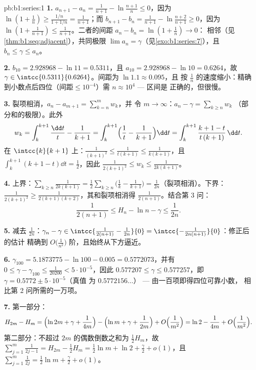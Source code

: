 \begin{solution}{pb:b1:series:1}
\textbf{1.} $a_{n+1} - a_n = \frac{1}{n+1} - \ln\frac{n+1}{n}
\leq 0$，因为 $\ln(1 + \frac1n) \geq \frac{1/n}{1 + 1/n} =
\frac{1}{n+1}$；而 $b_{n+1} - b_n = \frac{1}{n+1} -
\ln\frac{n+2}{n+1} \geq 0$，因为 $\ln(1 + \frac{1}{n+1}) \leq
\frac{1}{n+1}$。二者的间距 $a_n - b_n = \ln(1 + \frac1n) \to 0$：
相邻（见\cref{thm:b1:seq:adjacent}），共同极限 $\lim
a_n = \gamma$（见\cref{exo:b1:series:7}），且 $b_n \leq \gamma
\leq a_n$。

\textbf{2.} $b_{10} = 2.928968 - \ln 11 = 0.5311$，且 $a_{10} =
2.928968 - \ln 10 = 0.6264$，故 $\gamma \in
\intcc{0.5311}{0.6264}$。间距为 $\ln 1.1 \approx 0.095$，且
按 $\frac1n$ 的速度缩小：精确到小数点后四位（$\text{间距} \leq
10^{-4}$）需 $n \approx 10^4$ --- 区间是
正确的，但很慢。

\textbf{3.} 裂项相消，$a_n - a_{m+1} = \sum_{k=n}^{m} w_k$，并
令 $m \to \infty$：$a_n - \gamma = \sum_{k\geq n} w_k$
（部分和的极限）。此外
\[
w_k = \int_k^{k+1} \frac{\dd t}{t} - \frac{1}{k+1}
= \int_k^{k+1} \Bigl(\frac1t - \frac{1}{k+1}\Bigr)\dd t
= \int_k^{k+1} \frac{k + 1 - t}{t\,(k+1)}\,\dd t .
\]
在 $\intcc{k}{k+1}$ 上：$\frac{1}{(k+1)^2} \leq \frac{1}{t(k+1)}
\leq \frac{1}{k(k+1)}$，且 $\int_k^{k+1}(k + 1 - t)\dd t =
\frac12$，因此 $\frac{1}{2(k+1)^2} \leq w_k \leq
\frac{1}{2k(k+1)}$。

\textbf{4.} 上界：$\sum_{k \geq n} \frac{1}{2k(k+1)} =
\frac12\sum_{k\geq n}\bigl(\frac1k - \frac{1}{k+1}\bigr) =
\frac{1}{2n}$（裂项相消）。下界：$\frac{1}{2(k+1)^2} \geq
\frac{1}{2(k+1)(k+2)}$，其和裂项相消得
$\frac{1}{2(n+1)}$。结合第 3 问：
\[
\frac{1}{2(n+1)} \leq H_n - \ln n - \gamma \leq \frac{1}{2n} .
\]

\textbf{5.} 减去 $\frac{1}{2n}$：$\gamma_n - \gamma \in
\intcc{\frac{1}{2(n+1)} - \frac{1}{2n}}{0} =
\intcc{-\frac{1}{2n(n+1)}}{0}$：修正后的估计
精确到 $O\bigl(\frac{1}{n^2}\bigr)$ 阶，且始终从下方逼近。

\textbf{6.} $\gamma_{100} = 5.1873775 - \ln 100 - 0.005 =
0.5772073$，并有 $0 \leq \gamma - \gamma_{100} \leq
\frac{1}{20200} < 5\cdot10^{-5}$，因此 $0.577207 \leq \gamma
\leq 0.577257$，即 $\gamma = 0.5772 \pm 5\cdot10^{-5}$（真值
为 $0.5772156\dots$） --- 由一百项即得四位可靠小数，
相比第 2 问所需的一万项。

\textbf{7.} 第一部分：
\[
H_{2m} - H_m = \Bigl(\ln 2m + \gamma + \frac{1}{4m}\Bigr)
- \Bigl(\ln m + \gamma + \frac{1}{2m}\Bigr) +
O\Bigl(\frac{1}{m^2}\Bigr)
= \ln 2 - \frac{1}{4m} + O\Bigl(\frac{1}{m^2}\Bigr).
\]
第二部分：不超过 $2m$ 的偶数倒数之和为 $\frac12 H_m$，故
$\sum_{j=1}^{m}\frac{1}{2j-1} = H_{2m} - \frac12 H_m = \frac12
\ln m + \ln 2 + \frac\gamma2 + o(1)$，且 $\sum_{j=1}^m
\frac{1}{2j} = \frac12\ln m + \frac\gamma2 + o(1)$。


\end{solution}
